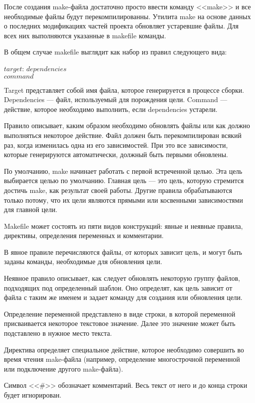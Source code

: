\documentclass[bachelor, och, coursework, times]{SCWorks}
\begin{document}
После создания make-файла достаточно просто ввести команду <<make>> и все необходимые файлы будут перекомпилированны. Утилита make на основе данных о последних модификациях частей проекта обновляет устаревшие файлы. Для всех них выполняются указанные в makefile команды. ~\cite{make1}

В общем случае makefile выглядит как набор из правил следующего вида:

$target$: \quad $dependencies$ \\
$ $\quad \quad \quad \quad \quad \quad $command$

Target представляет собой имя файла, которое генерируется в процессе сборки. Dependencies --- файл, используемый для порождения цели. Command --- действие, которое необходимо выполнить, если dependencies устарели.

Правило описывает, каким образом необходимо обновлять файлы или как должно выполняться некоторое действие. Файл должен быть перекомпилирован всякий раз, когда изменилась одна из его зависимостей. При это все зависимости, которые генерируются автоматически, должный быть первыми обновлены. 

По умолчанию, make начинает работать с первой встреченной целью. Эта цель выбирается целью по умолчанию. Главная цель --- это цель, которую стремится достичь make, как результат своей работы. Другие правила обрабатываются только потому, что их цели являются прямыми или косвенными зависимостями для главной цели. ~\cite{make2}

Makefile может состоять из пяти видов конструкций: явные и неявные правила, директивы, определения переменных и комментарии.

В явное правиле перечисляются файлы, от которых зависит цель, и могут быть заданы команды, необходимые для обновления цели.

Неявное правило описывает, как следует обновлять некоторую группу файлов, подходящих под определенный шаблон. Оно определят, как цель зависит от файла с таким же именем и задает команду для создания или обновления цели.

Определение переменной представлено в виде строки, в которой переменной присваивается некоторое текстовое значение. Далее это значение может быть подставлено в нужное место текста.

Директива определяет специальное действие, которое необходимо совершить во время чтения make-файла (например, определение многострочной переменной или подключение другого make-файла).

Символ <<\#>> обозначает комментарий. Весь текст от него и до конца строки будет игнорирован. 
\end{document}
